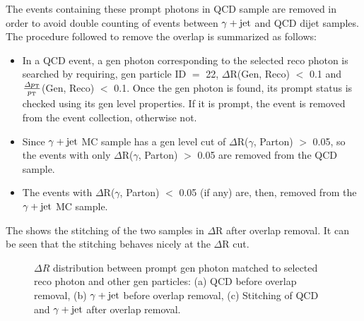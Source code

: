 The events containing these prompt photons in QCD sample are removed in order to avoid double counting of events between $\gamma+\mathrm{jet}$ and QCD dijet samples.
The procedure followed to remove the overlap is summarized as follows:

\begin{itemize}[leftmargin=*]
\item In a QCD event, a gen photon corresponding to the selected reco photon is searched by requiring, gen particle ID $=$ 22,
  $\Delta$R(Gen, Reco) $<$ 0.1 and $\frac{{\Delta}p_{\mathrm T}}{p_{\mathrm T}}$(Gen, Reco) $<$ 0.1. Once the gen photon is found, its prompt status is checked
  using its gen level properties. If it is prompt, the event is removed from the event collection, otherwise not.
\item Since $\gamma+\mathrm{jet}$ MC sample has a gen level cut of $\Delta$R($\gamma$, Parton) $>$ 0.05, so the events with only $\Delta$R($\gamma$, Parton) $>$ 0.05
  are removed from the QCD sample.
\item The events with $\Delta$R($\gamma$, Parton) $<$ 0.05 (if any) are, then, removed from the $\gamma+\mathrm{jet}$ MC sample.
\end{itemize}

The \fig{\ref{fig:stitch_dr}} shows the stitching of the two samples in $\Delta$R after overlap removal. It can be seen that the stitching behaves nicely at the
$\Delta$R cut.

\begin{figure}[htbp]
\centering
{}
\caption{$\Delta R$ distribution between prompt gen photon matched to selected reco photon and other gen particles: (a) QCD before overlap removal, (b) $\gamma+\mathrm{jet}$ before overlap removal, (c) Stitching of QCD and $\gamma+\mathrm{jet}$ after overlap removal.}
\label{fig:genDR}
\end{figure}

